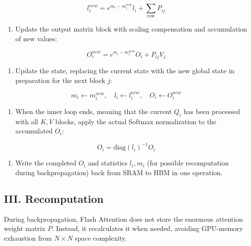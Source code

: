 \[
l_i^{new} = e^{m_i-m_i^{new}}l_i + \sum_{\text{row}} P_{ij}
\]

\begin{enumerate}
\def\labelenumi{\arabic{enumi}.}
\setcounter{enumi}{6}
\tightlist
\item
{}
  Update the output matrix block with scaling compensation and accumulation of new values:
\end{enumerate}

\[
O_i^{new} = e^{m_i-m_i^{new}}O_i + P_{ij}V_j
\]

\begin{enumerate}
\def\labelenumi{\arabic{enumi}.}
\setcounter{enumi}{7}
\tightlist
\item
{}
  Update the state, replacing the current state with the new global state in preparation for the next block \(j\):
\end{enumerate}

\[
m_i \leftarrow m_i^{new},\quad l_i \leftarrow l_i^{new},\quad O_i \leftarrow O_i^{new}
\]

\begin{enumerate}
\def\labelenumi{\arabic{enumi}.}
\setcounter{enumi}{3}
\tightlist
\item
{}
  When the inner loop ends, meaning that the current \(Q_i\) has been processed with all \(K,V\) blocks, apply the actual Softmax normalization to the accumulated \(O_i\):
\end{enumerate}

\[
O_i = \mathrm{diag}(l_i)^{-1}O_i
\]

\begin{enumerate}
\def\labelenumi{\arabic{enumi}.}
\setcounter{enumi}{4}
\tightlist
\item
  Write the completed \(O_i\) and statistics \(l_i,m_i\) (for possible recomputation during backpropagation) back from SRAM to HBM in one operation.
\end{enumerate}

\hypertarget{iii.-recomputation}{%
\subsection{III. Recomputation}\label{iii.-recomputation}}

During backpropagation, Flash Attention does not store the enormous attention weight matrix \(P\). Instead, it recalculates it when needed, avoiding GPU-memory exhaustion from \(N \times N\) space complexity.

